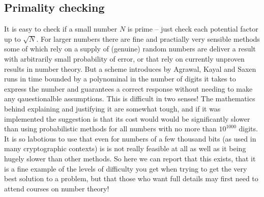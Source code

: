 \subsection{Primality checking}
It is easy to check if a small number $N$ is prime -- just check
each potential factor up to $\sqrt N$. For larger numbers there are
fine and practially very sensible methods some of which rely on a supply
of (genuine) random numbers are deliver a result with arbitrarily small
probability of error, or that rely on currently unproven results in
number theory. But a scheme introduces by Agrawal, Kayal and Saxen\cite{AKS}
runs in time bounded by a polynominal in the number of digits it takes to
express the number and guarantees a correct response without needing to
make any qauestionalble assumptions. This is difficult in two senses!
The mathematics behind explaining and justifying it are somewhat tough,
and if it was implemented the suggestion is that its cost would would
be significantly slower than using probabilistic methods for all
numbers with no more than $10^{1000}$ digits. It is so labotious to
use that even for numbers of a few thousand bits (as used in many
cryptographic contexts) is is not really feasible at all as well as it
being hugely slower than other methods. So here we can report that this
exists, that it is a fine example of the levels of difficulty you get
when trying to get the very best solution to a problem, but that those
who want full details may first need to attend courses on number
theory!

